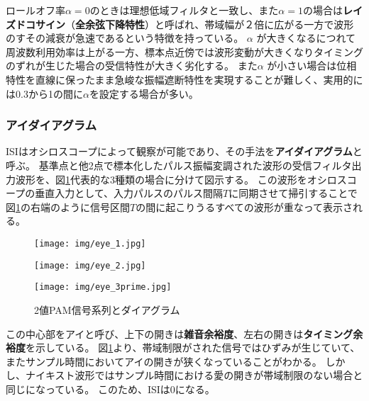 \documentclass[twocolumn, dvipdfmx, 9pt]{jsarticle}
\begin{document}
ロールオフ率$ \alpha = 0$のときは理想低域フィルタと一致し、また$ \alpha = 1$の場合は\textbf{レイズドコサイン}（\textbf{全余弦下降特性}）と呼ばれ、帯域幅が２倍に広がる一方で波形のすその減衰が急速であるという特徴を持っている。
$ \alpha $ が大きくなるにつれて周波数利用効率は上がる一方、標本点近傍では波形変動が大きくなりタイミングのずれが生じた場合の受信特性が大きく劣化する。
また$ \alpha $ が小さい場合は位相特性を直線に保ったまま急峻な振幅遮断特性を実現することが難しく、実用的には0.3から1の間に$ \alpha $を設定する場合が多い。


\subsubsection{アイダイアグラム}

ISIはオシロスコープによって観察が可能であり、その手法を\textbf{アイダイアグラム}と呼ぶ。
基準点と他2点で標本化したパルス振幅変調された波形の受信フィルタ出力波形を、図\ref{eye}代表的な3種類の場合に分けて図示する。
この波形をオシロスコープの垂直入力として、入力パルスのパルス間隔$T$に同期させて掃引することで図\ref{eye}の右端のように信号区間$T$の間に起こりうるすべての波形が重なって表示される。

\begin{figure}[htbp]
\begin{minipage}[b]{1.0\linewidth}



  \begin{center}
   \texttt{[image: img/eye\_1.jpg]}
  \end{center}

 \begin{center}
  \texttt{[image: img/eye\_2.jpg]}
 \end{center}

 \begin{center}
  \texttt{[image: img/eye\_3prime.jpg]}
 \end{center}

\end{minipage}
  \caption{2値PAM信号系列とダイアグラム}
  \label{eye}
  
\end{figure}



この中心部をアイと呼び、上下の開きは\textbf{雑音余裕度}、左右の開きは\textbf{タイミング余裕度}を示している。
図\ref{eye}より、帯域制限がされた信号ではひずみが生じていて、またサンプル時間においてアイの開きが狭くなっていることがわかる。
しかし、ナイキスト波形ではサンプル時間における愛の開きが帯域制限のない場合と同じになっている。
このため、ISIは0になる。
\end{document}
